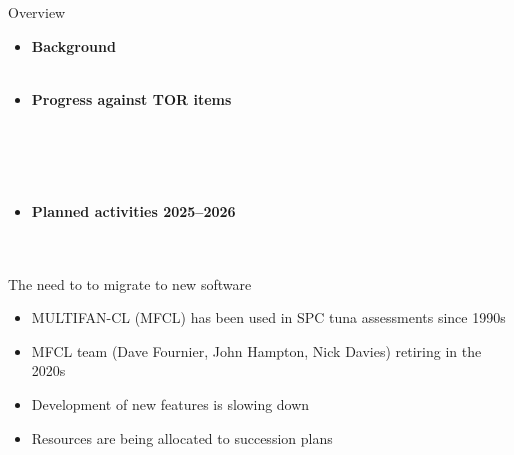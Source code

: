 \documentclass[aspectratio=169,fleqn]{beamer}
\begin{document}
\begin{frame}{Overview}
  \begin{itemize}
    \item[] {\bf\darkblue Background}\\[0.1ex]
    \\[4ex]
    \item[] {\bf\darkblue Progress against TOR items}\\[0.1ex]
    \\[0.1ex]
    \\[0.1ex]
    \\[0.1ex]
    \\[4ex]
    \item[] {\bf\darkblue Planned activities 2025--2026}\\[0.1ex]
    \\[0.1ex]
    \\[2ex]
  \end{itemize}
\end{frame}


\begin{frame}{The need to to migrate to new software}\small
  \begin{itemize}
    \item[] MULTIFAN-CL (MFCL) has been used in SPC tuna assessments since
    1990s\\[5ex]
    \item[] MFCL team (Dave Fournier, John Hampton, Nick Davies) retiring in the
    2020s\\[5ex]
    \item[] Development of new features is slowing down\\[5ex]
    \item[] Resources are being allocated to succession plans\\[4ex]
  \end{itemize}
\end{frame}
\end{document}
